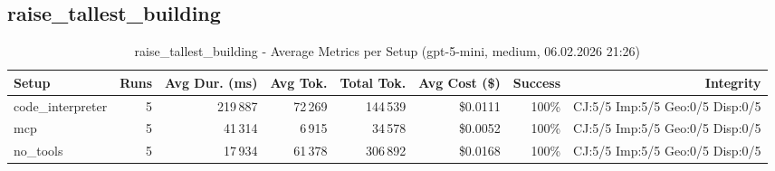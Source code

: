 \documentclass[a4paper,11pt]{article}
\begin{document}
\clearpage

\subsection{raise\_tallest\_building}

\begin{table}[H]
\centering
\scriptsize
\caption{raise\_tallest\_building - Average Metrics per Setup (gpt-5-mini, medium, 06.02.2026 21:26)}
\label{tab:combined\_raise\_tallest\_building\_metrics\_20260206}
\begin{tabular}{l r r r r r r r}
\toprule
Setup & Runs & Avg Dur. (ms) & Avg Tok. & Total Tok. & Avg Cost (\$) & Success & Integrity \\
\midrule
code\_interpreter & 5 & 219\,887 & 72\,269 & 144\,539 & \$0.0111 & 100\% & CJ:5/5 Imp:5/5 Geo:0/5 Disp:0/5 \\
mcp & 5 & 41\,314 & 6\,915 & 34\,578 & \$0.0052 & 100\% & CJ:5/5 Imp:5/5 Geo:0/5 Disp:0/5 \\
no\_tools & 5 & 17\,934 & 61\,378 & 306\,892 & \$0.0168 & 100\% & CJ:5/5 Imp:5/5 Geo:0/5 Disp:0/5 \\
\bottomrule
\end{tabular}
\end{table}
\end{document}
